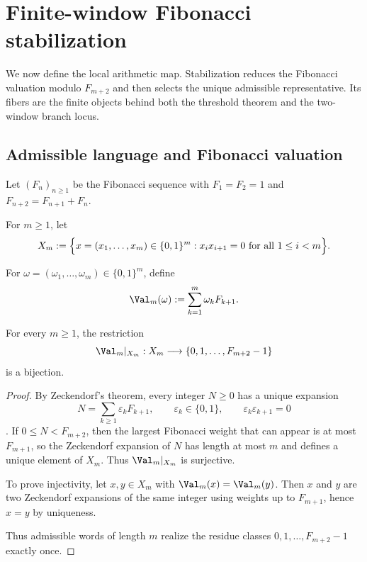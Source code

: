 \section{Finite-window Fibonacci stabilization}\label{sec:stabilization}

We now define the local arithmetic map. Stabilization reduces the Fibonacci valuation modulo $F_{m+2}$ and then selects the unique admissible representative. Its fibers are the finite objects behind both the threshold theorem and the two-window branch locus.

\subsection{Admissible language and Fibonacci valuation}\label{sec:stab:golden}

Let $(F_n)_{n\ge 1}$ be the Fibonacci sequence with $F_1=F_2=1$ and $F_{n+2}=F_{n+1}+F_n$.

\begin{definition}\label{def:Xm}
For $m\ge 1$, let
\[
X_m := \Bigl\{x=(x_1,\dots,x_m)\in\{0,1\}^m : x_i x_{i+1}=0\ \text{for all }1\le i<m\Bigr\}.
\]
\end{definition}

\begin{definition}\label{def:valuation}
For $\omega=(\omega_1,\ldots,\omega_m)\in\{0,1\}^m$, define
\[
\Val_m(\omega):=\sum_{k=1}^m \omega_k F_{k+1}.
\]
\end{definition}

\begin{proposition}\label{prop:finite-window-range}
For every $m\ge 1$, the restriction
\[
\Val_m|_{X_m}:X_m\longrightarrow \{0,1,\dots,F_{m+2}-1\}
\]
is a bijection.
\end{proposition}

\begin{proof}
By Zeckendorf's theorem, every integer $N\ge 0$ has a unique expansion
\[
N=\sum_{k\ge 1}\varepsilon_k F_{k+1},\qquad \varepsilon_k\in\{0,1\},\qquad \varepsilon_k\varepsilon_{k+1}=0
\]
\cite{Zeckendorf1972,Lothaire2002}. If $0\le N < F_{m+2}$, then the largest Fibonacci weight that can appear is at most $F_{m+1}$, so the Zeckendorf expansion of $N$ has length at most $m$ and defines a unique element of $X_m$. Thus $\Val_m|_{X_m}$ is surjective.

To prove injectivity, let $x,y\in X_m$ with $\Val_m(x)=\Val_m(y)$. Then $x$ and $y$ are two Zeckendorf expansions of the same integer using weights up to $F_{m+1}$, hence $x=y$ by uniqueness.

Thus admissible words of length $m$ realize the residue classes $0,1,\dots,F_{m+2}-1$ exactly once.
\end{proof}

